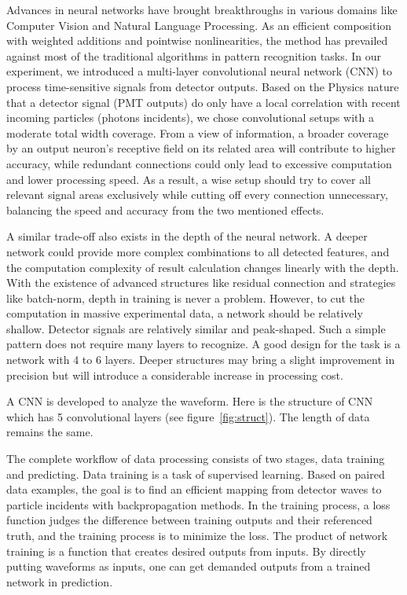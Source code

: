 Advances in neural networks have brought breakthroughs in various domains like Computer Vision and Natural Language Processing. As an efficient composition with weighted additions and pointwise nonlinearities, the method has prevailed against most of the traditional algorithms in pattern recognition tasks. In our experiment, we introduced a multi-layer convolutional neural network (CNN) to process time-sensitive signals from detector outputs. Based on the Physics nature that a detector signal (PMT outputs) do only have a local correlation with recent incoming particles (photons incidents), we chose convolutional setups with a moderate total width coverage. From a view of information, a broader coverage by an output neuron's receptive field on its related area will contribute to higher accuracy, while redundant connections could only lead to excessive computation and lower processing speed. As a result, a wise setup should try to cover all relevant signal areas exclusively while cutting off every connection unnecessary, balancing the speed and accuracy from the two mentioned effects.

A similar trade-off also exists in the depth of the neural network. A deeper network could provide more complex combinations to all detected features, and the computation complexity of result calculation changes linearly with the depth. With the existence of advanced structures like residual connection and strategies like batch-norm, depth in training is never a problem. However, to cut the computation in massive experimental data, a network should be relatively shallow. Detector signals are relatively similar and peak-shaped. Such a simple pattern does not require many layers to recognize. A good design for the task is a network with 4 to 6 layers. Deeper structures may bring a slight improvement in precision but will introduce a considerable increase in processing cost.

A CNN is developed to analyze the waveform. Here is the structure of CNN which has 5 convolutional layers (see figure~\ref{fig:struct}). The length of data remains the same. 


The complete workflow of data processing consists of two stages, data training and predicting. Data training is a task of supervised learning.  Based on paired data examples, the goal is to find an efficient mapping from detector waves to particle incidents with backpropagation methods. In the training process, a loss function judges the difference between training outputs and their referenced truth, and the training process is to minimize the loss. The product of network training is a function that creates desired outputs from inputs. By directly putting waveforms as inputs, one can get demanded outputs from a trained network in prediction.

